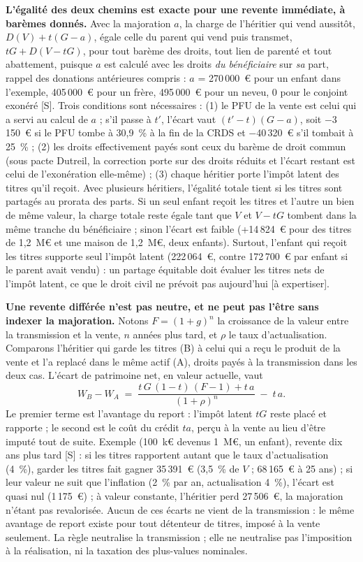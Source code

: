 \textbf{L'égalité des deux chemins est exacte pour une revente immédiate, à barèmes donnés.} Avec la majoration $a$,
la charge de l'héritier qui vend aussitôt, $D(V) + t(G-a)$, égale celle du parent qui vend puis transmet,
$tG + D(V-tG)$, pour tout barème des droits, tout lien de parenté et tout abattement, puisque $a$ est calculé avec
les droits \emph{du bénéficiaire} sur \emph{sa} part, rappel des donations antérieures compris : $a$ = 270\,000~€ pour
un enfant dans l'exemple, 405\,000~€ pour un frère, 495\,000~€ pour un neveu, 0 pour le conjoint exonéré [S]. Trois
conditions sont nécessaires : (1) le PFU de la vente est celui qui a servi au calcul de $a$ ; s'il passe à $t'$,
l'écart vaut $(t'-t)(G-a)$, soit $-$3\,150~€ si le PFU tombe à 30,9~\% à la fin de la CRDS et $-$40\,320~€ s'il
tombait à 25~\% ; (2) les droits effectivement payés sont ceux du barème de droit commun (sous pacte Dutreil, la
correction porte sur des droits réduits et l'écart restant est celui de l'exonération elle-même) ; (3) chaque héritier
porte l'impôt latent des titres qu'il reçoit. Avec plusieurs héritiers, l'égalité totale tient si les titres sont
partagés au prorata des parts. Si un seul enfant reçoit les titres et l'autre un bien de même valeur, la charge totale
reste égale tant que $V$ et $V-tG$ tombent dans la même tranche du bénéficiaire ; sinon l'écart est faible (+14\,824~€
pour des titres de 1,2~M€ et une maison de 1,2~M€, deux enfants). Surtout, l'enfant qui reçoit les titres supporte seul
l'impôt latent (222\,064~€, contre 172\,700~€ par enfant si le parent avait vendu) : un partage équitable doit évaluer
les titres nets de l'impôt latent, ce que le droit civil ne prévoit pas aujourd'hui [à expertiser].

\textbf{Une revente différée n'est pas neutre, et ne peut pas l'être sans indexer la majoration.} Notons $F=(1+g)^n$
la croissance de la valeur entre la transmission et la vente, $n$ années plus tard, et $\rho$ le taux d'actualisation.
Comparons l'héritier qui garde les titres (B) à celui qui a reçu le produit de la vente et l'a replacé dans le même
actif (A), droits payés à la transmission dans les deux cas. L'écart de patrimoine net, en valeur actuelle, vaut
\[
W_B - W_A \;=\; \frac{t\,G\,(1-t)\,(F-1) + t\,a}{(1+\rho)^n} \;-\; t\,a .
\]
Le premier terme est l'avantage du report : l'impôt latent $tG$ reste placé et rapporte ; le second est le coût du
crédit $ta$, perçu à la vente au lieu d'être imputé tout de suite. Exemple (100~k€ devenus 1~M€, un enfant), revente
dix ans plus tard [S] : si les titres rapportent autant que le taux d'actualisation (4~\%), garder les titres fait
gagner 35\,391~€ (3,5~\% de $V$ ; 68\,165~€ à 25 ans) ; si leur valeur ne suit que l'inflation (2~\% par an,
actualisation 4~\%), l'écart est quasi nul (1\,175~€) ; à valeur constante, l'héritier perd 27\,506~€, la majoration
n'étant pas revalorisée. Aucun de ces écarts ne vient de la transmission : le même avantage de report existe pour tout
détenteur de titres, imposé à la vente seulement. La règle neutralise la transmission ; elle ne neutralise pas
l'imposition à la réalisation, ni la taxation des plus-values nominales.

